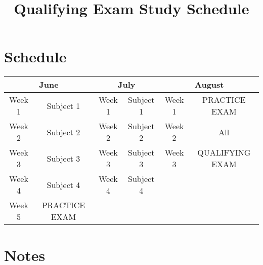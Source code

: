 \documentclass[12pt]{article}
\begin{document}
\title{Qualifying Exam Study Schedule}

\maketitle


\section*{Schedule}

\begin{center}
\begin{tabular}{c c | c c | c c}
\toprule
\multicolumn{2}{c}{June} &
\multicolumn{2}{c}{July} &
\multicolumn{2}{c}{August} \\
\midrule
Week 1 & Subject 1 & Week 1 & Subject 1 & Week 1 & PRACTICE EXAM \\
Week 2 & Subject 2 & Week 2 & Subject 2 & Week 2 & All \\
Week 3 & Subject 3 & Week 3 & Subject 3 & Week 3 & QUALIFYING EXAM \\
Week 4 & Subject 4 & Week 4 & Subject 4 &        &               \\
Week 5 & PRACTICE EXAM &        &           &        &               \\
\bottomrule
\end{tabular}
\end{center}

\section*{Notes}
\end{document}
